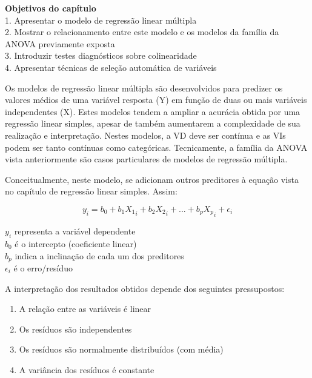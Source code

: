 \documentclass[
]{book}
\providecommand{\tightlist}{%
  \setlength{\itemsep}{0pt}\setlength{\parskip}{0pt}}
\newenvironment{objectives}{
  \definecolor{shadecolor}{rgb}{0.764,0.992,0.686}  %
  \color{black}
  \begin{shaded}}
 {\end{shaded}}
\begin{document}
\begin{objectives}
\textbf{Objetivos do capítulo}\\
1. Apresentar o modelo de regressão linear múltipla\\
2. Mostrar o relacionamento entre este modelo e os modelos da família da ANOVA previamente exposta\\
3. Introduzir testes diagnósticos sobre colinearidade\\
4. Apresentar técnicas de seleção automática de variáveis

\end{objectives}

Os modelos de regressão linear múltipla são desenvolvidos para predizer os valores médios de uma variável resposta (Y) em função de duas ou mais variáveis independentes (X). Estes modelos tendem a ampliar a acurácia obtida por uma regressão linear simples, apesar de também aumentarem a complexidade de sua realização e interpretação. Nestes modelos, a VD deve ser contínua e as VIs podem ser tanto contínuas como categóricas. Tecnicamente, a família da ANOVA vista anteriormente são casos particulares de modelos de regressão múltipla.

Conceitualmente, neste modelo, se adicionam outros preditores à equação vista no capítulo de regressão linear simples. Assim:

\[y_i = b_0 + b_1X{_1}_i + b_2X{_2}_i + ... + b_pX{_p}_i+ \epsilon_{i}\]

\(y_i\) representa a variável dependente\\
\(b_0\) é o intercepto (coeficiente linear)\\
\(b_p\) indica a inclinação de cada um dos preditores\\
\(\epsilon_{i}\) é o erro/resíduo

A interpretação dos resultados obtidos depende dos seguintes pressupostos:

\begin{enumerate}
\def\labelenumi{(\roman{enumi})}
\tightlist
\item
  A relação entre as variáveis é linear
\item
  Os resíduos são independentes\\
\item
  Os resíduos são normalmente distribuídos (com média)\\
\item
  A variância dos resíduos é constante
\end{enumerate}
\end{document}
